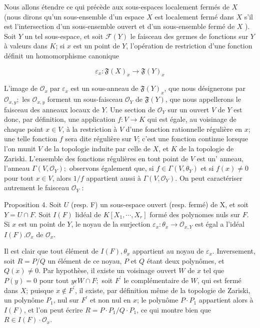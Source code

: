 Nous allons étendre ce qui précède aux sous-espaces localement fermés de $X$ (nous dirons qu'un sous-ensemble d'un espace $X$ est localement fermé dans $X$ s'il est l'intersection d'un sous-ensemble ouvert et d'un sous-ensemble fermé de $X$ ). Soit $Y$ un tel sous-espace, et soit $\mathcal{F}(Y)$ le faisceau des germes de fonctions sur $Y$ à valeurs dans $K$; si $x$ est un point de $Y$, l'opération de restriction d'une fonction définit un homomorphisme canonique

$$
\varepsilon_{x}: \mathfrak{F}(X)_{x} \rightarrow \mathfrak{F}(Y)_{x}
$$

L'image de $\mathcal{O}_{x} \operatorname{par} \varepsilon_{x}$ est un sous-anneau de $\mathfrak{F}(Y)_{x}$, que nous désignerons par $\mathcal{O}_{x, y} ;$ les $\mathcal{O}_{x, y}$ forment un sous-faisceau $\mathcal{O}_{Y}$ de $\mathfrak{F}(Y)$, que nous appellerons le faisceau des anneaux locaux de $Y$. Une section de $\mathcal{O}_{Y}$ sur un ouvert $V$ de $Y$ est donc, par définition, une application $f: V \rightarrow K$ qui est égale, au voisinage de chaque point $x \in V$, à la restriction à $V$ d'une fonction rationnelle régulière en $x$; une telle fonction $f$ sera dite régulière sur $V$; c'est une fonction continue lorsque l'on munit $V$ de la topologie induite par celle de $X$, et $K$ de la topologie de Zariski. L'ensemble des fonctions régulières en tout point de $V$ est un' anneau, l'anneau $\Gamma\left(V, \mathcal{O}_{Y}\right) ;$ observons également que, si $f \in \Gamma\left(V, \theta_{Y}\right)$ et si $f(x) \neq 0$ pour tout $x \in V$, alors $1 / f$ appartient aussi à $\Gamma\left(V, \mathcal{O}_{Y}\right)$. On peut caractériser autrement le faisceau $\mathcal{O}_{Y}$ :

Proposition 4. Soit $U$ (resp. F) un sous-espace ouvert (resp. fermé) de X, et soit $Y=U \cap F .$ Soit $I(F)$ lidéal de $K\left[X_{1}, \cdots, X_{r}\right]$ formé des polynomes nuls sur $F .$ Si $x$ est un point de $Y$, le noyau de la surjection $\varepsilon_{x}: \theta_{x} \rightarrow \mathcal{O}_{x, Y}$ est égal a l'idéal $I(F) . \mathcal{O}_{x}$ de $\mathcal{O}_{x}$.

Il est clair que tout élément de $I(F), \theta_{x}$ appartient au noyau de $\varepsilon_{x} .$ Inversement, soit $R=P / Q$ un élément de ce noyau, $P$ et $Q$ étant deux polynômes, et $Q(x) \neq 0 .$ Par hypothèse, il existe un voisinage ouvert $W$ de $x$ tel que $P(y)=0$ pour tout $y \epsilon W \cap F ;$ soit $F^{\prime}$ le complémentaire de $W$, qui est fermé dans $X$; puisque $x \notin F^{\prime}$, il existe, par définition même de la topologie de Zariski, un polynôme $P_{1}$, nul sur $F^{\prime}$ et non nul en $x$; le polynôme $P \cdot P_{1}$ appartient alors à $I(F)$, et l'on peut écrire $R=P \cdot P_{1} / Q \cdot P_{1}$, ce qui montre bien que $R \in I(F) \cdot \mathcal{O}_{x}$.

